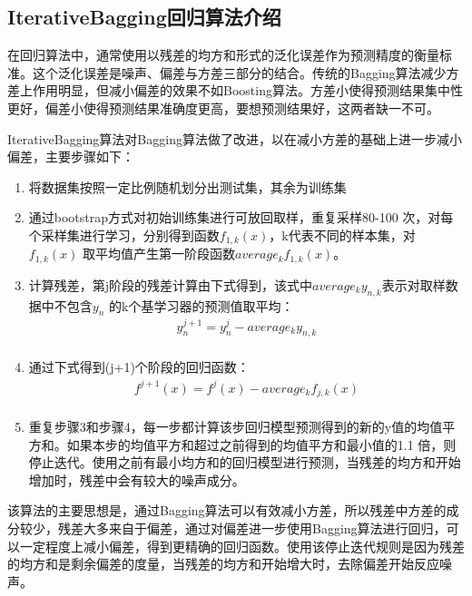 \documentclass[a4paper,oneside,12pt]{article}
\begin{document}
\begin{spacing}{1.5}
\subsection{IterativeBagging回归算法介绍}
在回归算法中，通常使用以残差的均方和形式的泛化误差作为预测精度的衡量标准。这个泛化误差是噪声、偏差与方差三部分的结合。传统的Bagging算法减少方差上作用明显，但减小偏差的效果不如Boosting算法。方差小使得预测结果集中性更好，偏差小使得预测结果准确度更高，要想预测结果好，这两者缺一不可。\par
IterativeBagging算法对Bagging算法做了改进，以在减小方差的基础上进一步减小偏差，主要步骤如下：
\begin{enumerate}
\item 将数据集按照一定比例随机划分出测试集，其余为训练集
\item 通过bootstrap方式对初始训练集进行可放回取样，重复采样80-100 次，对每个采样集进行学习，分别得到函数$f_{1,k}(x)$，k代表不同的样本集，对$f_{1,k}(x)$ 取平均值产生第一阶段函数$average_kf_{1,k}(x)$。
\item 计算残差，第j阶段的残差计算由下式得到，该式中$average_ky_{n,k}$表示对取样数据中不包含$y_n$ 的k个基学习器的预测值取平均：
\begin{equation}
\begin{array}{l}
y_n^{j+1}=y_n^j-average_ky_{n,k}\\
\end{array}
\end{equation}
\item 通过下式得到(j+1)个阶段的回归函数：
\begin{equation}
\begin{array}{l}
f^{j+1}(x)=f^j(x)-average_kf_{j,k}(x)\\
\end{array}
\end{equation}
\item 重复步骤3和步骤4，每一步都计算该步回归模型预测得到的新的y值的均值平方和。如果本步的均值平方和超过之前得到的均值平方和最小值的1.1 倍，则停止迭代。使用之前有最小均方和的回归模型进行预测，当残差的均方和开始增加时，残差中会有较大的噪声成分。
\end{enumerate}
该算法的主要思想是，通过Bagging算法可以有效减小方差，所以残差中方差的成分较少，残差大多来自于偏差，通过对偏差进一步使用Bagging算法进行回归，可以一定程度上减小偏差，得到更精确的回归函数。使用该停止迭代规则是因为残差的均方和是剩余偏差的度量，当残差的均方和开始增大时，去除偏差开始反应噪声。\par

\end{spacing}
\end{document}
